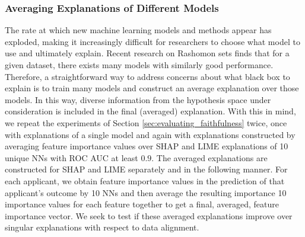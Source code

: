 \documentclass[mnsc,blindrev]{informs3}
\newcommand{\tw}[1]{\textcolor{red}{Tong: #1}}
\begin{document}
        \subsubsection{Averaging Explanations of Different Models}
            The rate at which new machine learning models and methods appear has exploded, making it increasingly difficult for researchers to choose what model to use and ultimately explain.  Recent research on Rashomon sets \citep{semenova22rashomon,wang2022timbertrek,donnelly2023rashomon} finds that for a given dataset, there exists many models with similarly good performance. %
            Therefore, a straightforward way to address concerns about what black box to explain is to train many models and construct an average explanation over those models. In this way, diverse information from the hypothesis space under consideration is included in the final (averaged) explanation. %
            With this in mind, we repeat the experiments of Section \ref{sec:evaluating_faithfulness} twice, once with explanations of a single model and again with explanations constructed by averaging feature importance values over SHAP and LIME explanations of 10 unique NNs with ROC AUC at least $0.9$. The averaged explanations are constructed for SHAP and LIME separately and in the following manner. For each applicant, we obtain feature importance values in the prediction of that applicant's outcome by 10 NNs and then average the resulting importance 10 importance values for each feature together to get a final, averaged, feature importance vector. We seek to test if these averaged explanations improve over singular explanations with respect to data alignment.
             
\end{document}
